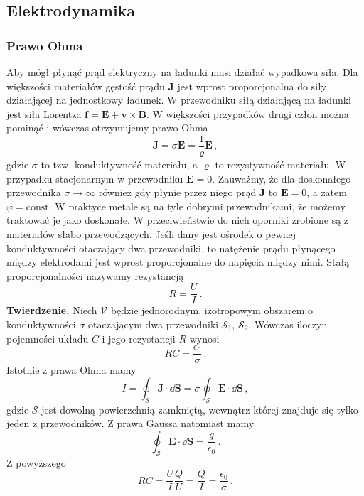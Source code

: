 \documentclass[../main.tex]{subfiles}
\begin{document}
\subsection{Elektrodynamika}
\subsubsection{Prawo Ohma}
Aby mógł płynąć prąd elektryczny na ładunki musi działać wypadkowa siła. Dla większości materiałów
gęstość prądu \(\mathbf{J}\) jest wprost proporcjonalna do siły działającej na jednostkowy ładunek.
W przewodniku siłą działającą na ładunki jest siła Lorentza
\(\mathbf{f}=\mathbf{E}+\mathbf{v}\times\mathbf{B}\). W większości przypadków drugi człon można
pominąć i wówczas otrzymujemy prawo Ohma
\begin{equation*}
    \mathbf{J}=\sigma\mathbf{E}=\frac{1}{\varrho}\mathbf{E}\,,
\end{equation*}
gdzie \(\sigma\) to tzw. konduktywność materiału, a \(\varrho\) to rezystywność materiału. W
przypadku stacjonarnym w przewodniku \(\mathbf{E}=0\). Zauważmy, że dla doskonałego przewodnika
\(\sigma\to\infty\) również gdy płynie przez niego prąd \(\mathbf{J}\) to \(\mathbf{E}=0\), a zatem
\(\varphi=\text{const}\). W praktyce metale są na tyle dobrymi przewodnikami, że możemy traktować je
jako doskonałe. W przeciwieństwie do nich oporniki zrobione są z materiałów słabo przewodzących.
Jeśli dany jest ośrodek o pewnej konduktywności otaczający dwa przewodniki, to natężenie prądu
płynącego między elektrodami jest wprost proporcjonalne do napięcia między nimi. Stałą
proporcjonalności nazywamy rezystancją
\begin{equation*}
    R=\frac{U}{I}\,.
\end{equation*}
\textbf{Twierdzenie.} Niech \(\mathcal{V}\) będzie jednorodnym, izotropowym obszarem o
konduktywności \(\sigma\) otaczającym dwa przewodniki \(\mathcal{S}_1\), \(\mathcal{S}_2\). Wówczas
iloczyn pojemności układu \(C\) i jego rezystancji \(R\) wynosi
\begin{equation*}
    RC=\frac{\epsilon_0}{\sigma}\,.
\end{equation*}
Istotnie z prawa Ohma mamy
\begin{equation*}
    I=\oint_\mathcal{S}\mathbf{J}\cdot\dd{\mathbf{S}}=\sigma\oint_\mathcal{S}\mathbf{E}\cdot\dd{\mathbf{S}}\,,
\end{equation*}
gdzie \(\mathcal{S}\) jest dowolną powierzchnią zamkniętą, wewnątrz której znajduje się tylko jeden
z przewodników. Z prawa Gaussa natomiast mamy
\begin{equation*}
    \oint_\mathcal{S}\mathbf{E}\cdot\dd{\mathbf{S}}=\frac{q}{\epsilon_0}\,.
\end{equation*}
Z powyższego
\begin{equation*}
    RC=\frac{U}{I}\frac{Q}{U}=\frac{Q}{I}=\frac{\epsilon_0}{\sigma}\,.
\end{equation*}
\end{document}
